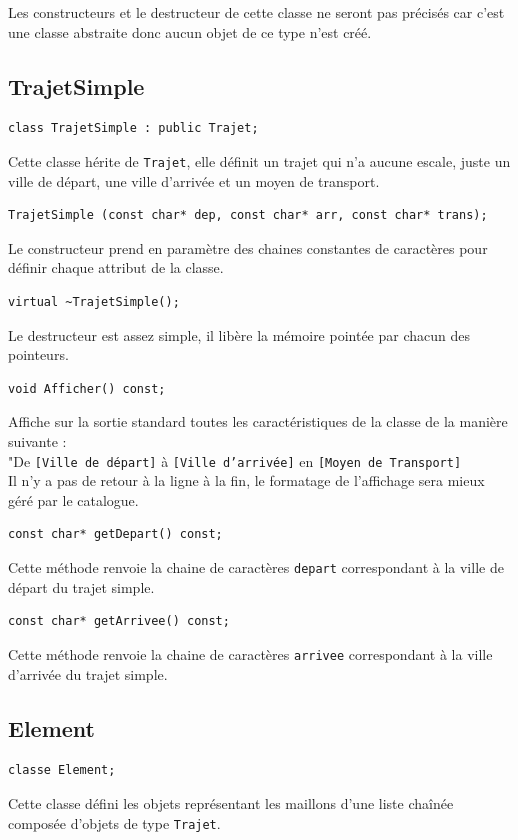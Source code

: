 \documentclass[11pt, a4paper]{article}
\begin{document}
Les constructeurs et le destructeur de cette classe ne seront pas précisés car c'est une classe
abstraite donc aucun objet de ce type n'est créé.\\

\subsection{TrajetSimple}
\begin{lstlisting}
class TrajetSimple : public Trajet;
\end{lstlisting}
Cette classe hérite de \texttt{Trajet}, elle définit un trajet qui n'a aucune escale, juste un
ville de départ, une ville d'arrivée et un moyen de transport.

\begin{lstlisting}
TrajetSimple (const char* dep, const char* arr, const char* trans);
\end{lstlisting}
Le constructeur prend en paramètre des chaines constantes de caractères pour définir chaque attribut
de la classe.

\begin{lstlisting}
virtual ~TrajetSimple();
\end{lstlisting}
Le destructeur est assez simple, il libère la mémoire pointée par chacun des pointeurs.

\begin{lstlisting}
void Afficher() const;
\end{lstlisting}
Affiche sur la sortie standard toutes les caractéristiques de la classe de la manière suivante :\\
"De \texttt{[Ville de départ]} à \texttt{[Ville d'arrivée]} en \texttt{[Moyen de Transport]}\\
Il n'y a pas de retour à la ligne à la fin, le formatage de l'affichage sera mieux géré par le
catalogue.

\begin{lstlisting}
const char* getDepart() const;
\end{lstlisting}
Cette méthode renvoie la chaine de caractères \texttt{depart} correspondant à la ville de départ du
trajet simple.

\begin{lstlisting}
const char* getArrivee() const;
\end{lstlisting}
Cette méthode renvoie la chaine de caractères \texttt{arrivee} correspondant à la ville d'arrivée du
trajet simple.\\

\subsection{Element}
\begin{lstlisting}
classe Element;
\end{lstlisting}
Cette classe défini les objets représentant les maillons d'une liste chaînée composée d'objets de
type \texttt{Trajet}.
\end{document}
